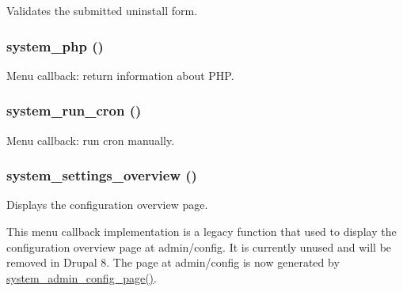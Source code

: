 \label{system_8admin_8inc_a043bb0ba8fa3b299202ffee8d63e9fca}
Validates the submitted uninstall form. \hypertarget{system_8admin_8inc_a8b63014dfdc3c9eabbaf62ff9ef456fc}{
\subsubsection[{system\_\-php}]{\setlength{\rightskip}{0pt plus 5cm}system\_\-php ()}}
\label{system_8admin_8inc_a8b63014dfdc3c9eabbaf62ff9ef456fc}
Menu callback: return information about PHP. \hypertarget{system_8admin_8inc_adf6e4af7e3bed308ad0dd53d1541104a}{
\subsubsection[{system\_\-run\_\-cron}]{\setlength{\rightskip}{0pt plus 5cm}system\_\-run\_\-cron ()}}
\label{system_8admin_8inc_adf6e4af7e3bed308ad0dd53d1541104a}
Menu callback: run cron manually. \hypertarget{system_8admin_8inc_a8f7e131c5d7173602739c67ef91093de}{
\subsubsection[{system\_\-settings\_\-overview}]{\setlength{\rightskip}{0pt plus 5cm}system\_\-settings\_\-overview ()}}
\label{system_8admin_8inc_a8f7e131c5d7173602739c67ef91093de}
Displays the configuration overview page.

This menu callback implementation is a legacy function that used to display the configuration overview page at admin/config. It is currently unused and will be removed in Drupal 8. The page at admin/config is now generated by \hyperlink{system_8admin_8inc_a5da84f893a839fab8b3d748ecb52de9d}{system\_\-admin\_\-config\_\-page()}.

